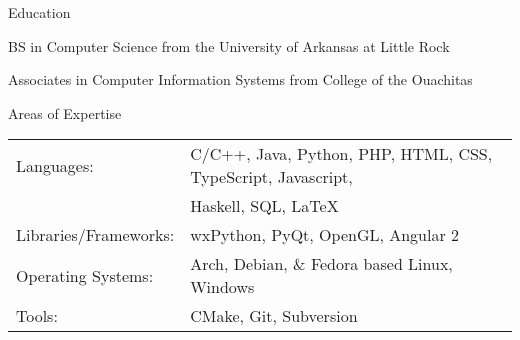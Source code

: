 \documentclass{resume}
\newcommand{\btab}[2]{
  \bgroup
  \def\arraystretch{#1}
  \begin{tabular}{#2}
}
\newcommand{\etab}{
  \end{tabular} \smallskip
  \egroup
}
\begin{document}
\begin{rSection}{Education}
  \item BS in Computer Science from the University of Arkansas at Little Rock
  \item Associates in Computer Information Systems from College of the Ouachitas
\end{rSection}

\begin{rSection}{Areas of Expertise}
  \btab{1.1}{ l l }
    Languages: & C\slash{}C++, Java, Python, PHP, HTML, CSS, TypeScript,
                 Javascript,  \\
               & Haskell, SQL, \LaTeX{} \\
    Libraries\slash{}Frameworks: & wxPython, PyQt, OpenGL, Angular 2 \\
    Operating Systems: & Arch, Debian, \& Fedora based Linux, Windows \\
    Tools: & CMake, Git, Subversion
  \etab
\end{rSection}
\end{document}
